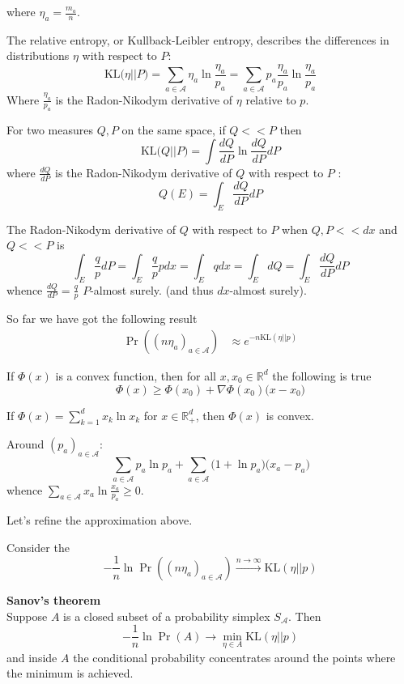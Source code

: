 \documentclass[a4paper]{article}
\newcommand{\brac}[1]{{\left ( #1 \right )}}
\newcommand{\Real}{\mathbb{R}}
\newcommand{\Acal}{\mathcal{A}}
\begin{document}
where $\eta_a = \frac{m_a}{n}$. 

The relative entropy, or Kullback-Leibler entropy, describes the differences in distributions $\eta$ with respect to $P$:
\[\text{KL}\big( \eta \lvert \rvert P\big) = \sum_{a\in \Acal} \eta_a \ln \frac{\eta_a}{p_a} = \sum_{a\in \Acal} p_a \frac{\eta_a}{p_a} \ln \frac{\eta_a}{p_a} \]
Where $\frac{\eta_a}{p_a}$ is the Radon-Nikodym derivative of $\eta$ relative to $p$.

For two measures $Q,P$ on the same space, if $Q<<P$ then
\[\text{KL}\big( Q \lvert \rvert P\big) = \int \frac{dQ}{dP} \ln \frac{dQ}{dP} dP\]
where $\frac{dQ}{dP}$ is the Radon-Nikodym derivative of $Q$ with respect to $P$ :
\[Q(E) = \int_E \frac{dQ}{dP} dP\]

The Radon-Nikodym derivative of $Q$ with respect to $P$ when $Q,P<<dx$ and $Q<<P$ is
\[\int_E \frac{q}{p} dP = \int_E \frac{q}{p} p dx = \int_E q dx = \int_E dQ = \int_E \frac{dQ}{dP} dP\]
whence $\frac{dQ}{dP} = \frac{q}{p}$ $P$-almost surely. (and thus $dx$-almost surely).

So far we have got the following result
\begin{align*}
	\Pr\brac{\brac{n \eta_a}_{a\in \Acal}} &\approx e^{- n \text{KL}\brac{\eta \lvert\rvert p}}
\end{align*}

If $\Phi(x)$ is a convex function, then for all $x,x_0\in \Real^d$ the following is true
\[ \Phi(x) \geq \Phi(x_0) + \nabla \Phi(x_0) \big(x-x_0\big) \]

If $\Phi(x) = \sum_{k=1}^d x_k \ln x_k$ for $x\in \Real_+^d$, then $\Phi(x)$ is convex.

Around $\brac{p_a}_{a\in \Acal}$:
\[\sum_{a\in \Acal} p_a \ln p_a + \sum_{a\in \Acal} \big(1 + \ln p_a \big) \big(x_a - p_a\big)\]
whence $\sum_{a\in \Acal} x_a \ln\frac{x_a}{p_a} \geq 0$.


Let's refine the approximation above.

Consider the 
\[-\frac{1}{n}\ln\Pr\brac{\brac{n \eta_a}_{a\in \Acal}} \overset{n\to\infty}{\to} \text{KL}\brac{\eta \lvert\rvert p} \]

\noindent\textbf{Sanov's theorem}\hfill\\
Suppose $A$ is a closed subset of a probability simplex $S_\Acal$. Then 
\[-\frac{1}{n}\ln \Pr\brac{A}\to \min_{\eta\in A} \text{KL}\brac{\eta \lvert\rvert p} \]
and inside $A$ the conditional probability concentrates around the points where the minimum is achieved.
\end{document}
